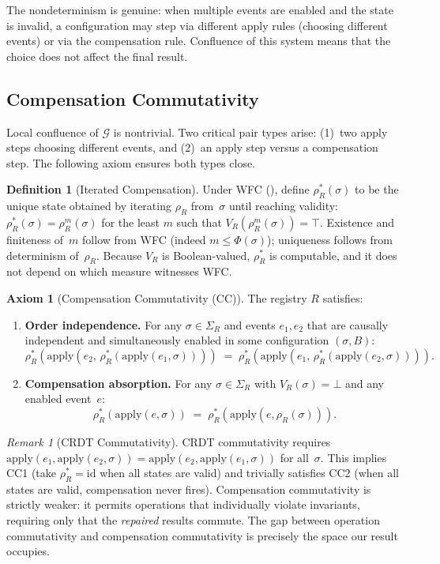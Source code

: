 \documentclass[11pt,a4paper]{article}
\theoremstyle{plain}
\theoremstyle{definition}
\newtheorem{definition}[theorem]{Definition}
\newtheorem{axiom}[theorem]{Axiom}
\theoremstyle{remark}
\newtheorem{remark}[theorem]{Remark}
\begin{document}
The nondeterminism is genuine: when multiple events are enabled and the state
is invalid, a configuration may step via different apply rules (choosing
different events) or via the compensation rule.  Confluence of this system
means that the choice does not affect the final result.

\subsection{Compensation Commutativity}

Local confluence of $\mathcal{G}$ is nontrivial.  Two critical pair types
arise: (1)~two apply steps choosing different events, and (2)~an apply step
versus a compensation step.  The following axiom ensures both types close.

\begin{definition}[Iterated Compensation]
\label{def:rhostar}
Under WFC (), define $\rho_R^*(\sigma)$ to be the unique state
obtained by iterating $\rho_R$ from~$\sigma$ until reaching validity:
$\rho_R^*(\sigma) = \rho_R^{m}(\sigma)$ for the least $m$ such that
$V_R(\rho_R^{m}(\sigma)) = \top$.  Existence and finiteness of~$m$ follow from
WFC (indeed $m \le \Phi(\sigma)$); uniqueness follows from determinism
of~$\rho_R$.  Because $V_R$ is Boolean-valued, $\rho_R^*$ is computable, and it
does not depend on which measure witnesses WFC.
\end{definition}

\begin{axiom}[Compensation Commutativity (CC)]
\label{ax:cc}
The registry $R$ satisfies:
\begin{enumerate}[leftmargin=*,nosep]
\item[\textbf{(CC1)}] \textbf{Order independence.}\; For any
  $\sigma \in \Sigma_R$ and events $e_1, e_2$ that are causally independent
  and simultaneously enabled in some configuration $(\sigma, B)$:
  \[
  \rho_R^*(\mathrm{apply}(e_2,\, \rho_R^*(\mathrm{apply}(e_1, \sigma))))
  \;=\;
  \rho_R^*(\mathrm{apply}(e_1,\, \rho_R^*(\mathrm{apply}(e_2, \sigma)))).
  \]
\item[\textbf{(CC2)}] \textbf{Compensation absorption.}\; For any
  $\sigma \in \Sigma_R$ with $V_R(\sigma) = \bot$ and any enabled event~$e$:
  \[
  \rho_R^*(\mathrm{apply}(e, \sigma))
  \;=\;
  \rho_R^*(\mathrm{apply}(e, \rho_R(\sigma))).
  \]
\end{enumerate}
\end{axiom}

\begin{remark}[CRDT Commutativity]
\label{rem:crdt-comparison}
CRDT commutativity requires
$\mathrm{apply}(e_1, \mathrm{apply}(e_2, \sigma)) =
\mathrm{apply}(e_2, \mathrm{apply}(e_1, \sigma))$ for all~$\sigma$.  This
implies CC1 (take $\rho_R^* = \mathrm{id}$ when all states are valid) and
trivially satisfies CC2 (when all states are valid, compensation never fires).
Compensation commutativity is strictly weaker: it permits operations that
individually violate invariants, requiring only that the \emph{repaired}
results commute.  The gap between operation commutativity and compensation
commutativity is precisely the space our result occupies.
\end{remark}
\end{document}
